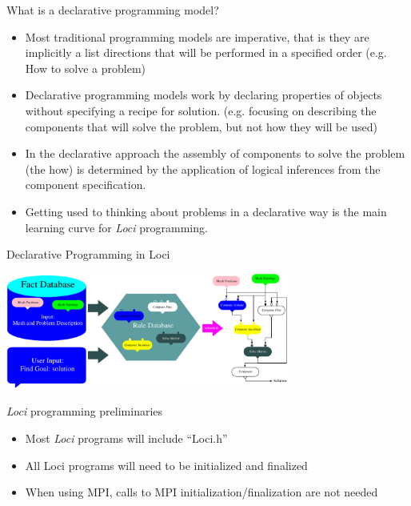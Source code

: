 \documentclass{beamer}
\begin{document}
\begin{frame}{What is a declarative programming model?}
\begin{itemize}
\item Most traditional programming models are imperative, that is they are implicitly a list directions that will be performed in a specified order (e.g. How to solve a problem)
\item Declarative programming models work by declaring properties of objects without specifying a recipe for solution.  (e.g. focusing on describing the components that will solve the problem, but not how they will be used)
\item In the declarative approach the assembly of components to solve the problem (the how) is determined by the application of logical inferences from the component specification.
\item Getting used to thinking about problems in a declarative way is the main learning curve for {\it Loci} programming.
\end{itemize}
\end{frame}
\begin{frame}{Declarative Programming in Loci}
\begin{center}
\includegraphics[height=1.5in]{Figures/ruledb}
\end{center}
\end{frame}
\begin{frame}{{\it Loci} programming preliminaries}
\begin{itemize}
 \item Most {\it Loci} programs will include ``Loci.h''
 \item All Loci programs will need to be initialized and finalized
 \item When using MPI, calls to MPI initialization/finalization are not needed
\end{itemize}
\end{frame}
\end{document}
